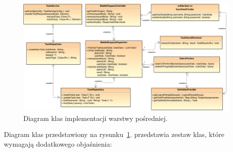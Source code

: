 \begin{figure}[h]
\centerline{\includegraphics[scale=0.45]{classDiagram}}
\caption{Diagram klas implementacji warstwy pośredniej.}
\label{fig:classDiagram}
\end{figure}

Diagram klas przedstawiony na rysunku~\ref{fig:classDiagram}. przedstawia zestaw klas, które wymagają dodatkowego objaśnienia: 


